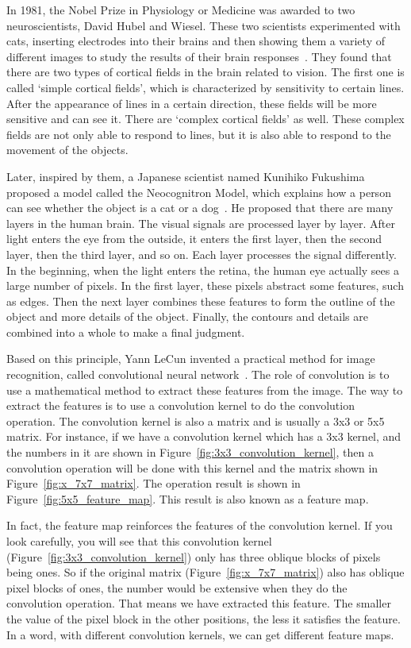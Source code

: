 In 1981, the Nobel Prize in Physiology or Medicine was awarded to two neuroscientists, David Hubel and Wiesel. These two scientists experimented with cats, inserting electrodes into their brains and then showing them a variety of different images to study the results of their brain responses~\cite{hubel1962receptive}. They found that there are two types of cortical fields in the brain related to vision. The first one is called `simple cortical fields', which is characterized by sensitivity to certain lines. After the appearance of lines in a certain direction, these fields will be more sensitive and can see it. There are `complex cortical fields' as well. These complex fields are not only able to respond to lines, but it is also able to respond to the movement of the objects.


Later, inspired by them, a Japanese scientist named Kunihiko Fukushima proposed a model called the Neocognitron Model, which explains how a person can see whether the object is a cat or a dog~\cite{fukushima1982neocognitron}. He proposed that there are many layers in the human brain. The visual signals are processed layer by layer. After light enters the eye from the outside, it enters the first layer, then the second layer, then the third layer, and so on. Each layer processes the signal differently. In the beginning, when the light enters the retina, the human eye actually sees a large number of pixels. In the first layer, these pixels abstract some features, such as edges. Then the next layer combines these features to form the outline of the object and more details of the object. Finally, the contours and details are combined into a whole to make a final judgment.


Based on this principle, Yann LeCun invented a practical method for image recognition, called convolutional neural network~\cite{lecun1995convolutional}. The role of convolution is to use a mathematical method to extract these features from the image. The way to extract the features is to use a convolution kernel to do the convolution operation. The convolution kernel is also a matrix and is usually a 3x3 or 5x5 matrix. For instance, if we have a convolution kernel which has a 3x3 kernel, and the numbers in it are shown in Figure~\ref{fig:3x3_convolution_kernel}, then a convolution operation will be done with this kernel and the matrix shown in Figure~\ref{fig:x_7x7_matrix}. The operation result is shown in Figure~\ref{fig:5x5_feature_map}. This result is also known as a feature map.


In fact, the feature map reinforces the features of the convolution kernel. If you look carefully, you will see that this convolution kernel (Figure~\ref{fig:3x3_convolution_kernel}) only has three oblique blocks of pixels being ones. So if the original matrix (Figure~\ref{fig:x_7x7_matrix}) also has oblique pixel blocks of ones, the number would be extensive when they do the convolution operation. That means we have extracted this feature. The smaller the value of the pixel block in the other positions, the less it satisfies the feature. In a word, with different convolution kernels, we can get different feature maps.

